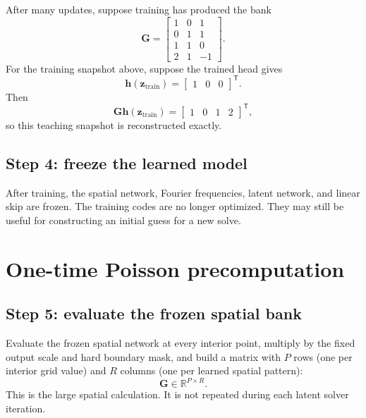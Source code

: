 \documentclass[11pt]{article}
\newcommand{\mat}[1]{\mathbf{#1}}
\newcommand{\vect}[1]{\mathbf{#1}}
\newcommand{\R}{\mathbb{R}}
\begin{document}
After many updates, suppose training has produced the bank
\begin{equation}
\label{eq:Gtoy}
  \mat{G}
  =\begin{bmatrix}
      1&0& 1\\
      0&1& 1\\
      1&1& 0\\
      2&1&-1
    \end{bmatrix}.
\end{equation}
For the training snapshot above, suppose the trained head gives
\begin{equation}
  \vect{h}(\vect{z}_{\mathrm{train}})
  =\begin{bmatrix}1&0&0\end{bmatrix}^{\mathsf T}.
\end{equation}
Then
\begin{equation}
  \mat{G}\vect{h}(\vect{z}_{\mathrm{train}})
  =\begin{bmatrix}1&0&1&2\end{bmatrix}^{\mathsf T},
\end{equation}
so this teaching snapshot is reconstructed exactly.

\subsection{Step 4: freeze the learned model}

After training, the spatial network, Fourier frequencies, latent network, and
linear skip are frozen.  The training codes are no longer optimized.  They
may still be useful for constructing an initial guess for a new solve.

\section{One-time Poisson precomputation}

\subsection{Step 5: evaluate the frozen spatial bank}

Evaluate the frozen spatial network at every interior point, multiply by the
fixed output scale and hard boundary mask, and build a matrix with $P$ rows
(one per interior grid value) and $R$ columns (one per learned spatial pattern):
\begin{equation}
  \mat{G}\in\R^{P\times R}.
\end{equation}
This is the large spatial calculation.  It is not repeated during each latent
solver iteration.
\end{document}
